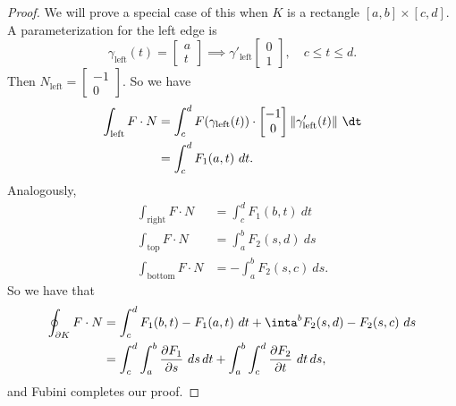 \documentclass[11pt]{article}
\theoremstyle{definition}
\newcommand{\mat}{\begin{bmatrix}}
\newcommand{\trix}{\end{bmatrix}}
\newcommand{\dell}{\partial}
\begin{document}
\begin{proof}
    We will prove a special case of this when $K$ is a rectangle $[a,b]\times [c,d]$. A parameterization for the left edge is
    $$
    \gamma_\mathrm{left}(t)=\mat a \\ t\trix\implies \gamma'_\mathrm{left}\mat 0 \\ 1 \trix,\quad c\leq t \leq d.
    $$
    Then $N_\mathrm{left}=\mat -1 \\ 0 \trix$. So we have
    $$
    \begin{aligned}
    \int_\mathrm{left} F\cdot N &= \int_c^d F(\gamma_\mathrm{left}(t))\cdot \mat -1 \\ 0 \trix \|\gamma_\mathrm{left}'(t)\|~\dt \\
    &=\int_c^d F_1(a,t)~dt.
    \end{aligned}
    $$
    Analogously,
    $$
    \begin{aligned}
    \int_\mathrm{right}F\cdot N &= \int_c^d F_1(b,t)~dt\\
    \int_\mathrm{top} F\cdot N&=\int_a^b F_2 (s,d)~ds\\
    \int_\mathrm{bottom} F\cdot N &= -\int_a^b F_2(s,c)~ds.
    \end{aligned}
    $$
    So we have that 
    $$
    \begin{aligned}
        \oint_{\dell K} F\cdot N &= \int_c^d F_1(b,t)-F_1(a,t)~dt + \inta^b F_2(s,d)-F_2(s,c)~ds\\
        &=\int_c^d\int_a^b \frac{\dell F_1}{\dell s}~ds\,dt + \int_a^b\int_c^d \frac{\dell F_2}{\dell t}~dt\,ds,
    \end{aligned}
    $$
    and Fubini completes our proof.
\end{proof}
\end{document}
